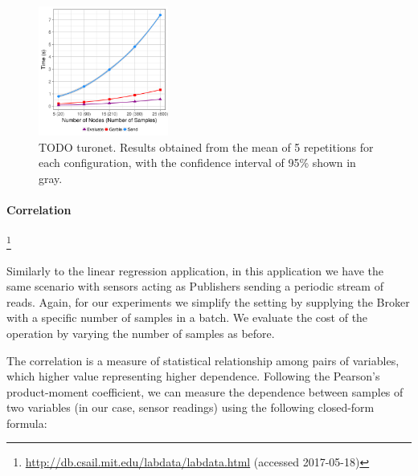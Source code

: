 
\begin{figure}
  \includegraphics[width=0.38\textwidth]{plots/turonet.png}
  \caption{TODO turonet.  Results obtained from the mean of 5 repetitions for
    each configuration, with the confidence interval of 95\% shown in gray.}
  \label{turonet-times}
\end{figure}


\paragraph{Correlation}


\footnote{\url{http://db.csail.mit.edu/labdata/labdata.html} (accessed 2017-05-18)}


Similarly to the linear regression application, in this application we have the
same scenario with sensors acting as Publishers sending a periodic stream of
reads.  Again, for our experiments we simplify the setting by supplying the
Broker with a specific number of samples in a batch.  We evaluate the cost of
the operation by varying the number of samples as before.

The correlation is a measure of statistical relationship among pairs of
variables, which higher value representing higher dependence.  Following the
Pearson's product-moment coefficient, we can measure the dependence between
samples of two variables (in our case, sensor readings) using the following
closed-form formula:

